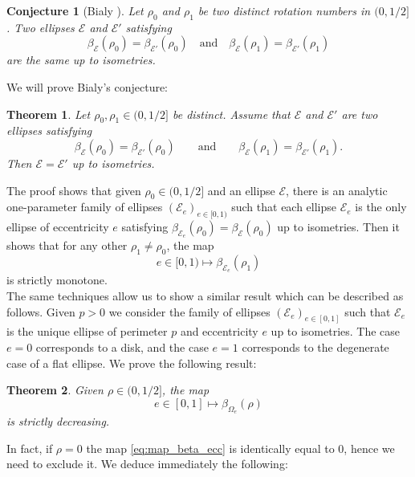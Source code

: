 \documentclass[a4paper]{article}
\newtheorem{theorem}{Theorem}
\newtheorem{conjecture}{Conjecture}
\theoremstyle{definition}
\begin{document}
\begin{conjecture}[Bialy \cite{Bialyellipses}]
Let $\rho_0$ and $\rho_1$ be two distinct rotation numbers in $(0,1/2]$. Two ellipses $\mathscr E$ and $\mathscr E'$ satisfying
\[
\beta_{\mathscr E}\left(\rho_0\right) = 
\beta_{\mathscr E'}\left(\rho_0\right)
\quad\text{and}\quad
\beta_{\mathscr E}\left(\rho_1\right) = 
\beta_{\mathscr E'}\left(\rho_1\right)
\]
are the same up to isometries.
\end{conjecture}

We will prove Bialy's conjecture:

\begin{theorem}
\label{thm:main_bialy_conj}
    Let $\rho_0,\rho_1\in(0,1/2]$ be distinct. Assume that $\mathscr E$ and $\mathscr E'$ are two ellipses satisfying
    \[
    \beta_{\mathscr E}(\rho_0) = \beta_{\mathscr E'}(\rho_0)
    \qquad\text{and}\qquad
    \beta_{\mathscr E}(\rho_1) = \beta_{\mathscr E'}(\rho_1).
    \]
    Then $\mathscr E=\mathscr E'$ up to isometries.
\end{theorem}

The proof shows that given $\rho_0\in(0,1/2]$ and an ellipse $\mathscr E$, there is an analytic one-parameter family of ellipses $(\mathscr E_e)_{e\in[0,1)}$ such that each ellipse $\mathscr E_e$ is the only ellipse of eccentricity $e$ satisfying $\beta_{\mathscr E_e}(\rho_0)=\beta_{\mathscr E}(\rho_0)$ up to isometries. Then it shows that for any other $\rho_1\neq\rho_0$, the map 
\[
e\in[0,1)\mapsto\beta_{\mathscr E_e}(\rho_1)
\]
is strictly monotone.\\

The same techniques allow us to show a similar result which can be described as follows. Given $p>0$ we consider the family of ellipses $(\mathscr E_e)_{e\in[0,1]}$ such that $\mathscr E_e$ is the unique ellipse of perimeter $p$ and eccentricity $e$ up to isometries. The case $e=0$ corresponds to a disk, and the case $e=1$ corresponds to the degenerate case of a flat ellipse. We prove the following result:

\begin{theorem}
\label{thm:main_cst_perimeter}
    Given $\rho\in(0,1/2]$, the map 
    \begin{equation}
    \label{eq:map_beta_ecc}
    e\in[0,1]\mapsto\beta_{\Omega_e}(\rho)
    \end{equation}
    is strictly decreasing.
\end{theorem}

In fact, if $\rho=0$ the map \eqref{eq:map_beta_ecc} is identically equal to $0$, hence we need to exclude it. We deduce immediately the following:
\end{document}
